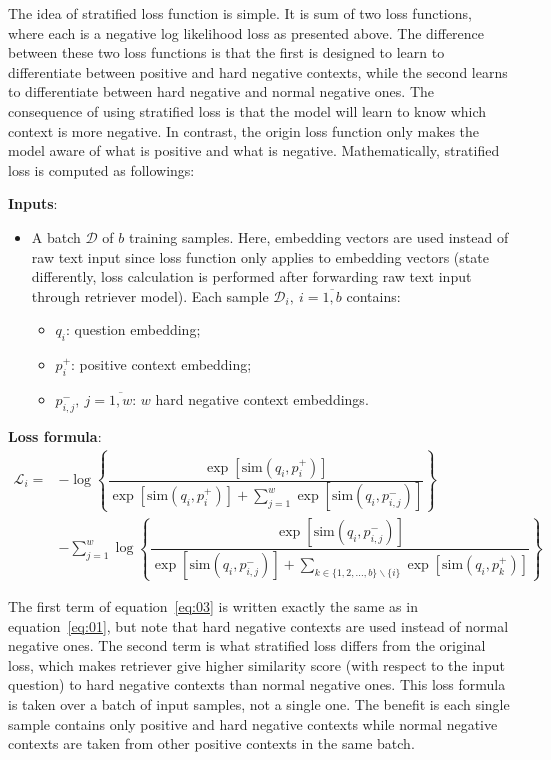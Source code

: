 \documentclass[3p, sort&compress, 12pt]{elsarticle}
\begin{document}
\par The idea of stratified loss function is simple. It is sum of two loss functions, where each is a negative log likelihood loss as presented above. The difference between these two loss functions is that the first is designed to learn to differentiate between positive and hard negative contexts, while the second learns to differentiate between hard negative and normal negative ones. The consequence of using stratified loss is that the model will learn to know which context is more negative. In contrast, the origin loss function only makes the model aware of what is positive and what is negative. Mathematically, stratified loss is computed as followings:
\par\textbf{Inputs}:
\begin{itemize}
	\item A batch $\mathcal{D}$ of $b$ training samples. Here, embedding vectors are used instead of raw text input since loss function only applies to embedding vectors (state differently, loss calculation is performed after forwarding raw text input through retriever model). Each sample $\mathcal{D}_i, \:i = \overline{1, b}$ contains:
	\begin{itemize}
		\item $q_i$: question embedding;
		\item $p_i^+$: positive context embedding;
		\item $p_{i,j}^-,\: j=\overline{1, w}$: $w$ hard negative context embeddings.
	\end{itemize} 
\end{itemize}
\par\textbf{Loss formula}:
\begin{equation}
\begin{array}{ll}
	\label{eq:03}
	\mathcal{L}_i = &-\log\left\{\dfrac{\exp\left[{\text{sim}\left(q_i, p_i^+\right)}\right]}{\exp\left[{\text{sim}\left(q_i, p_i^+\right)}\right] + \sum\limits_{j=1}^w\exp\left[\text{sim}\left(q_i, p_{i,j}^-\right)\right]}\right\} \\[40pt]
	&-\sum\limits_{j=1}^w\log\left\{\dfrac{\exp\left[\text{sim}\left(q_i, p_{i,j}^-\right)\right]}{\exp\left[\text{sim}\left(q_i, p_{i,j}^-\right)\right] + \sum\limits_{k\in \{1, 2,..., b\}\backslash\{i\}} \exp\left[\text{sim}\left(q_i, p_k^+\right)\right]}\right\}
\end{array}
\end{equation}
\par The first term of equation~\eqref{eq:03} is written exactly the same as in equation~\eqref{eq:01}, but note that hard negative contexts are used instead of normal negative ones. The second term is what stratified loss differs from the original loss, which makes retriever give higher similarity score (with respect to the input question) to hard negative contexts than normal negative ones. This loss formula is taken over a batch of input samples, not a single one. The benefit is each single sample contains only positive and hard negative contexts while normal negative contexts are taken from other positive contexts in the same batch. 
\end{document}
